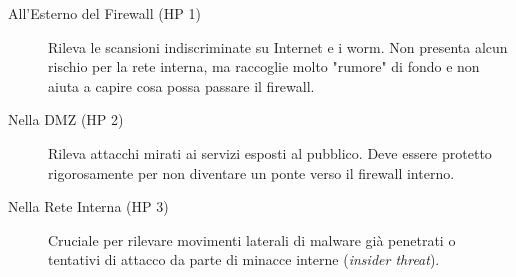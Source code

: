 \begin{description}
    \item[All'Esterno del Firewall (HP 1)] Rileva le scansioni indiscriminate su Internet e i worm. Non presenta alcun rischio per la rete interna, ma raccoglie molto "rumore" di fondo e non aiuta a capire cosa possa passare il firewall.
    \item[Nella DMZ (HP 2)] Rileva attacchi mirati ai servizi esposti al pubblico. Deve essere protetto rigorosamente per non diventare un ponte verso il firewall interno.
    \item[Nella Rete Interna (HP 3)] Cruciale per rilevare movimenti laterali di malware già penetrati o tentativi di attacco da parte di minacce interne (\textit{insider threat}). 
\end{description}

